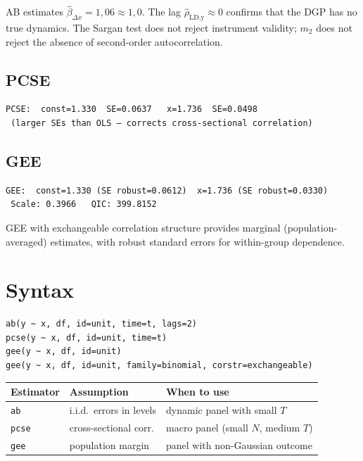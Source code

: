 AB estimates $\hat\beta_{\Delta x} = 1{,}06 \approx 1{,}0$. The lag $\hat\rho_{\mathrm{LD.y}} \approx 0$ confirms that the DGP has no true dynamics. The Sargan test does not reject instrument validity; $m_2$ does not reject the absence of second-order autocorrelation.

\subsection*{PCSE}

\begin{lstlisting}[language={}, basicstyle=\ttfamily\small,
  frame=none, numbers=none, backgroundcolor=\color{codbg},
  xleftmargin=0pt, xrightmargin=0pt, breaklines=false]
 PCSE:  const=1.330  SE=0.0637   x=1.736  SE=0.0498
 (larger SEs than OLS — corrects cross-sectional correlation)
\end{lstlisting}

\subsection*{GEE}

\begin{lstlisting}[language={}, basicstyle=\ttfamily\small,
  frame=none, numbers=none, backgroundcolor=\color{codbg},
  xleftmargin=0pt, xrightmargin=0pt, breaklines=false]
 GEE:  const=1.330 (SE robust=0.0612)  x=1.736 (SE robust=0.0330)
 Scale: 0.3966   QIC: 399.8152
\end{lstlisting}

GEE with exchangeable correlation structure provides marginal (population-averaged)
estimates, with robust standard errors for within-group dependence.

\section{Syntax}

\begin{lstlisting}
ab(y ~ x, df, id=unit, time=t, lags=2)
pcse(y ~ x, df, id=unit, time=t)
gee(y ~ x, df, id=unit)
gee(y ~ x, df, id=unit, family=binomial, corstr=exchangeable)
\end{lstlisting}

\begin{center}
\begin{tabular}{lll}
\toprule
\textbf{Estimator} & \textbf{Assumption} & \textbf{When to use} \\
\midrule
\texttt{ab}    & i.i.d.\ errors in levels & dynamic panel with small $T$ \\
\texttt{pcse}  & cross-sectional corr.    & macro panel (small $N$, medium $T$) \\
\texttt{gee}   & population margin        & panel with non-Gaussian outcome \\
\bottomrule
\end{tabular}
\end{center}
